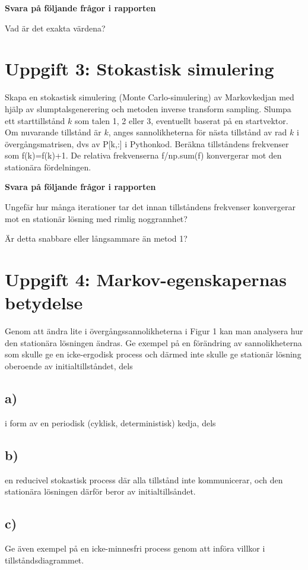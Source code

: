 \documentclass[a4paper]{article}
\begin{document}
\textbf{Svara på följande frågor i rapporten}

Vad är det exakta värdena?


\section{Uppgift 3: Stokastisk simulering}
Skapa en stokastisk simulering (Monte Carlo-simulering) av Markovkedjan med hjälp av
slumptalsgenerering och metoden inverse transform sampling. Slumpa ett starttillstånd \( k \) som
talen 1, 2 eller 3, eventuellt baserat på en startvektor. Om nuvarande tillstånd är \( k \), anges
sannolikheterna för nästa tillstånd av rad \( k \) i övergångsmatrisen, dvs av P[k,:] i Pythonkod.
Beräkna tillståndens frekvenser som f(k)=f(k)+1. De relativa frekvenserna f/np.sum(f)
konvergerar mot den stationära fördelningen.


\textbf{Svara på följande frågor i rapporten}

Ungefär hur många iterationer tar det innan
tillståndens frekvenser konvergerar mot en stationär lösning med rimlig noggrannhet?

Är detta snabbare eller långsammare än metod 1?


\section{Uppgift 4: Markov-egenskapernas betydelse}
Genom att ändra lite i övergångssannolikheterna i Figur 1 kan man analysera hur den
stationära lösningen ändras. Ge exempel på en förändring av sannolikheterna som skulle ge
en icke-ergodisk process och därmed inte skulle ge stationär lösning oberoende av
initialtillståndet, dels

\subsection{a)}
i form av en periodisk (cyklisk, deterministisk) kedja, dels

\subsection{b)}
en reducivel stokastisk process där alla tillstånd inte kommunicerar, och den stationära
lösningen därför beror av initialtillsåndet.

\subsection{c)}
Ge även exempel på en icke-minnesfri process genom att införa villkor i tillståndsdiagrammet.
\end{document}
